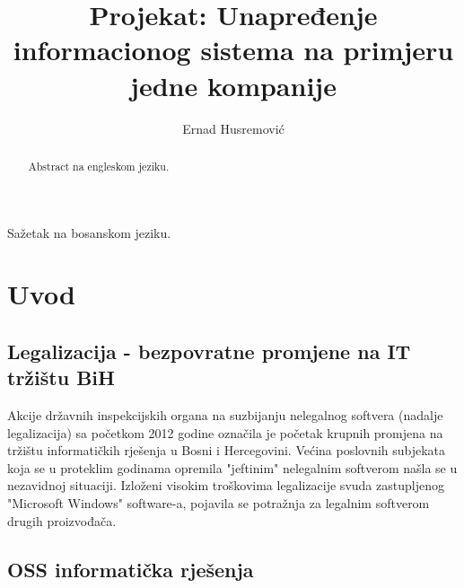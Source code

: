 \documentclass[times, utf8, seminar]{fit}
\begin{document}
\title{Projekat: Unapređenje informacionog sistema na primjeru jedne kompanije}

\author{Ernad Husremović}


\maketitle

\tableofcontents

\begin{sazetak}


Sažetak na bosanskom jeziku.

\end{sazetak}

\begin{abstract}
Abstract na engleskom jeziku.

\end{abstract}




\chapter{Uvod}

\section{Legalizacija - bezpovratne promjene na IT tržištu BiH}

Akcije državnih inspekcijskih organa na suzbijanju nelegalnog softvera (nadalje legalizacija) sa početkom 2012 godine označila je početak krupnih promjena na tržištu informatičkih  rješenja u Bosni i Hercegovini. 
Većina poslovnih subjekata koja se u proteklim godinama opremila "jeftinim" nelegalnim softverom  našla se u nezavidnoj situaciji.
Izloženi visokim troškovima legalizacije svuda zastupljenog "Microsoft Windows" software-a, pojavila se potražnja za legalnim softverom drugih proizvođača.  

\section{OSS informatička rješenja}
\end{document}
